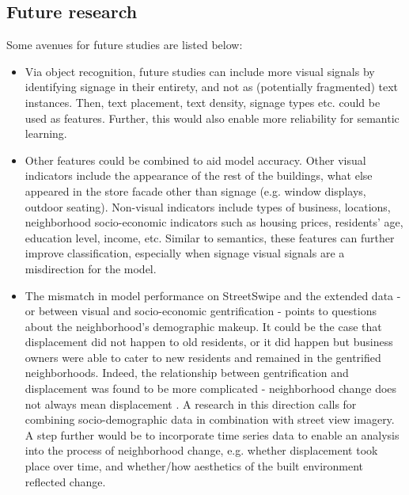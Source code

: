 \subsection{Future research}
Some avenues for future studies are listed below:
\begin{itemize}
    \item Via object recognition, future studies can include more visual signals by identifying signage in their entirety, and not as (potentially fragmented) text instances. Then, text placement, text density, signage types etc. could be used as features. Further, this would also enable more reliability for semantic learning.

    \item Other features could be combined to aid model accuracy. Other visual indicators include the appearance of the rest of the buildings, what else appeared in the store facade other than signage (e.g. window displays, outdoor seating). Non-visual indicators include types of business, locations, neighborhood socio-economic indicators such as housing prices, residents' age, education level, income, etc. Similar to semantics, these features can further improve classification, especially when signage visual signals are a misdirection for the model.
    
    \item The mismatch in model performance on StreetSwipe and the extended data - or between visual and socio-economic gentrification - points to questions about the neighborhood's demographic makeup. It could be the case that displacement did not happen to old residents, or it did happen but business owners were able to cater to new residents and remained in the gentrified neighborhoods. Indeed, the relationship between gentrification and displacement was found to be more complicated - neighborhood change does not always mean displacement \cite{hochstenbach_anatomy_2015}. A research in this direction calls for combining socio-demographic data in combination with street view imagery. A step further would be to incorporate time series data to enable an analysis into the process of neighborhood change, e.g. whether displacement took place over time, and whether/how aesthetics of the built environment reflected change.
\end{itemize}
